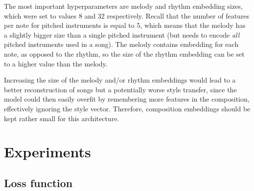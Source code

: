 \documentclass[en]{pracamgr}
\begin{document}
The most important hyperparameters are melody and rhythm embedding sizes, which were set to values 8 and 32 respectively.
Recall that the number of features per note for pitched instruments is equal to 5, which means that
the melody has a slightly bigger size than a single pitched instrument (but needs to encode \emph{all} pitched instruments used in a song).
The melody contains embedding for each note, as opposed to the rhythm, so the size of the rhythm embedding can be set to a higher value than the melody.

Increasing the size of the melody and/or rhythm embeddings would lead to a better reconstruction of songs but a potentially worse style transfer, since the model could then easily overfit by remembering more features in the composition, effectively ignoring the style vector.
Therefore, composition embeddings should be kept rather small for this architecture.

\chapter{Experiments}

\section{Loss function}
\end{document}
